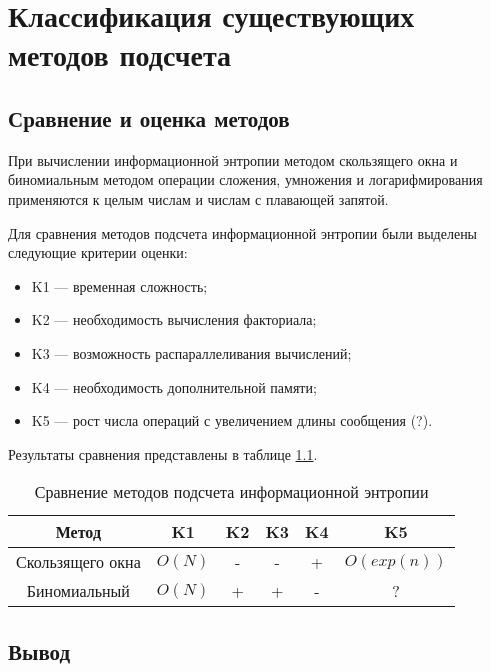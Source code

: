\chapter{Классификация существующих методов подсчета}

\section{Сравнение и оценка методов}

При вычислении информационной энтропии методом скользящего окна и биномиальным методом операции сложения, умножения и логарифмирования применяются к целым числам и числам с плавающей запятой. 

Для сравнения методов подсчета информационной энтропии были выделены следующие критерии оценки:

\begin{itemize}
	\item K1 --- временная сложность;
	\item K2 --- необходимость вычисления факториала;
	\item K3 --- возможность распараллеливания вычислений;
	\item K4 --- необходимость дополнительной памяти;
	\item K5 --- рост числа операций с увеличением длины сообщения (?).
\end{itemize}

Результаты сравнения представлены в таблице \ref{tab:comparison}.

\begin{table}[h]
    \caption{Сравнение методов подсчета информационной энтропии}
    \begin{center}
        \begin{tabular}{|c|c|c|c|c|c|}
        		\hline
            \textbf{Метод} & \textbf{K1} & \textbf{K2} & \textbf{K3}
             & \textbf{K4} & \textbf{K5} \\ \hline
            Скользящего окна &  $O(N)$ & - & - & + & $O(exp(n))$ \\ \hline
            Биномиальный &  $O(N)$ & + & + & - & ? \\  \hline
        \end{tabular}
    \end{center}
    \label{tab:comparison}
\end{table}

\section{Вывод}